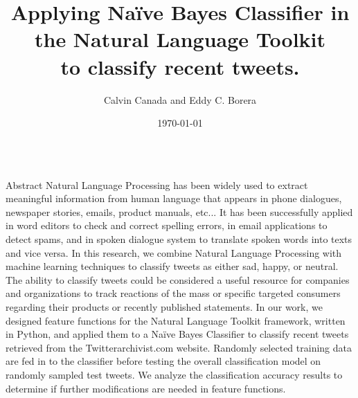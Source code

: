 \documentclass[final]{beamer} %
\title{Applying Na\"{i}ve Bayes Classifier in the Natural Language Toolkit \\
to classify recent tweets.}
\author{Calvin Canada and Eddy C. Borera}
\institute[Jacobs University]
          {School of Computing and Informatics, Lipscomb University,
           One University Park Dr., Nashville, TN}
\date{\today}
\begin{document}

\begin{frame}[t]
 \begin{columns}[t] %
 
  \begin{column}{0.28\paperwidth}%
  	
   	\begin{alertblock}{Abstract}
   	Natural Language Processing has been widely used to extract 
   	meaningful information from human language that appears in phone 
   	dialogues, newspaper stories, emails, product manuals, etc... 
   	It has been successfully applied in word editors to check and correct 
   	spelling errors, in email applications to detect spams, and in spoken 
   	dialogue system to translate spoken words into texts and vice versa. 
   	In this research, we combine Natural Language Processing with machine 
   	learning techniques to classify tweets as either sad, happy, or neutral. 
   	The ability to classify tweets could be considered a useful resource for 
   	companies and organizations to track reactions of the mass or specific 
   	targeted consumers regarding their products or recently published statements. 
   	In our work, we designed feature functions for the Natural Language Toolkit 
   	framework, written in Python, and applied them to a Na\"{i}ve Bayes Classifier 
   	to classify recent tweets retrieved from the Twitterarchivist.com website. 
   	Randomly selected training data are fed in to the classifier before testing 
   	the overall classification model on randomly sampled test tweets. We analyze 
   	the classification accuracy results to determine if further modifications 
   	are needed in feature functions.
   \end{alertblock}
	


\end{column}
\end{columns}
\end{frame}
\end{document}
